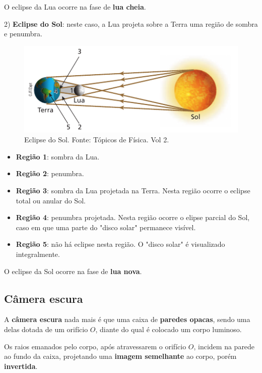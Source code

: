 \documentclass[11pt,twocolumn,oneside]{article}
\begin{document}
O eclipse da Lua ocorre na fase de \textbf{lua cheia}.


2) \textbf{Eclipse do Sol}: neste caso, a Lua projeta sobre a Terra uma região de sombra e penumbra.


\begin{figure}[h]{}
\centering\includegraphics[width=2.5truein]{img21.png}
\caption{Eclipse do Sol. Fonte: Tópicos de Física. Vol 2.}
\centering
\end{figure}

\begin{itemize}

\item \textbf{Região 1}: sombra da Lua.

\item \textbf{Região 2}: penumbra.

\item \textbf{Região 3}: sombra da Lua projetada na Terra. Nesta região ocorre o eclipse total ou anular do Sol.

\item \textbf{Região 4}: penumbra projetada. Nesta região ocorre o elipse parcial do Sol, caso em que uma parte do "disco solar" permanece visível.

\item \textbf{Região 5}: não há eclipse nesta região. O "disco solar" é visualizado integralmente.

\end{itemize}


O eclipse da Sol ocorre na fase de \textbf{lua nova}.


\hypertarget{x-câmera-escura}{\subsection{Câmera escura}}
A \textbf{câmera escura} nada mais é que uma caixa de \textbf{paredes opacas}, sendo uma delas dotada de um orifício \textbf{$O$}, diante do qual é colocado um corpo luminoso.


Os raios emanados pelo corpo, após atravessarem o orifício \textbf{$O$}, incidem na parede ao fundo da caixa, projetando uma \textbf{imagem semelhante} ao corpo, porém \textbf{invertida}.
\end{document}
